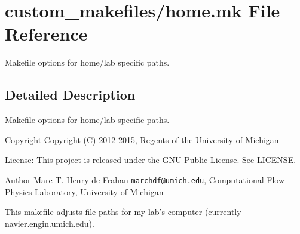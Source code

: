 \section{custom\-\_\-makefiles/home.mk File Reference}
\label{home_8mk}


Makefile options for home/lab specific paths.  




\subsection{Detailed Description}
Makefile options for home/lab specific paths. \begin{DoxyCopyright}{Copyright}
Copyright (C) 2012-\/2015, Regents of the University of Michigan 
\end{DoxyCopyright}
\begin{DoxyParagraph}{License\-:}
This project is released under the G\-N\-U Public License. See L\-I\-C\-E\-N\-S\-E. 
\end{DoxyParagraph}
\begin{DoxyAuthor}{Author}
Marc T. Henry de Frahan {\tt marchdf@umich.\-edu}, Computational Flow Physics Laboratory, University of Michigan
\end{DoxyAuthor}
This makefile adjusts file paths for my lab's computer (currently navier.\-engin.\-umich.\-edu). 